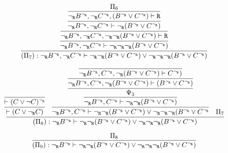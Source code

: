 \begin{enumerate}[(i)]
\begin{itemize}
            $$
                \infer{
                    (\Pi_7) : \ngr B^\ngr, \ngr C^\ngr \vdash \ngr\ngr(B^\ngr \vee C^\ngr) \vee \ngr\ngr\ngr (B^\ngr \vee C^\ngr)
                }{
                    \infer{
                        \ngr B^\ngr, \ngr C^\ngr \vdash \ngr\ngr\ngr (B^\ngr \vee C^\ngr)
                    }{
                        \infer{
                            \ngr B^\ngr, \ngr C^\ngr, \ngr\ngr (B^\ngr \vee C^\ngr) \vdash \R
                        }{
                            \infer{
                                \ngr B^\ngr, \ngr C^\ngr \vdash \ngr (B^\ngr \vee C^\ngr)
                            }{
                                \infer{
                                    \ngr B^\ngr, \ngr C^\ngr, (B^\ngr \vee C^\ngr) \vdash \R
                                }{
                                    \Pi_6
                                }
                            }
                        }
                    }
                }
            $$

            $$
            \infer{
                (\Pi_8) : \ngr B^\ngr \vdash \ngr\ngr(B^\ngr \vee C^\ngr) \vee \ngr\ngr\ngr (B^\ngr \vee C^\ngr)
            }{
                \infer{
                    \vdash (C \vee \ngr C)
                }{
                        \infer{\vdash (C \vee \neg C)^\ngr
                    }{
                    }
                }&
                \infer{
                    \ngr B^\ngr, C^\ngr \vdash \ngr\ngr(B^\ngr \vee C^\ngr) \vee \ngr\ngr\ngr (B^\ngr \vee C^\ngr
                }{
                    \infer{
                        \ngr B^\ngr, C^\ngr \vdash \ngr\ngr(B^\ngr \vee C^\ngr)
                    }{
                        \infer
                        {
                            \Psi_3
                        }{
                            \infer{
                                \ngr B^\ngr, C^\ngr, \ngr(B^\ngr \vee C^\ngr)\vdash (B^\ngr \vee C^\ngr)
                            }{
                                \infer{
                                    \ngr B^\ngr, C^\ngr, \ngr(B^\ngr \vee C^\ngr)\vdash C^\ngr)
                                }{
                                }
                            }
                        }
                    }
                }&
                \Pi_7
            }
            $$
            
            $$
                    \infer{
                        (\Pi_9) : \ngr B^\ngr \vdash \ngr\ngr(B^\ngr \vee C^\ngr) \vee \ngr\ngr\ngr (B^\ngr \vee C^\ngr)
                    }{
                        \Pi_8
                    }
            $$


\end{itemize}
\end{enumerate}
